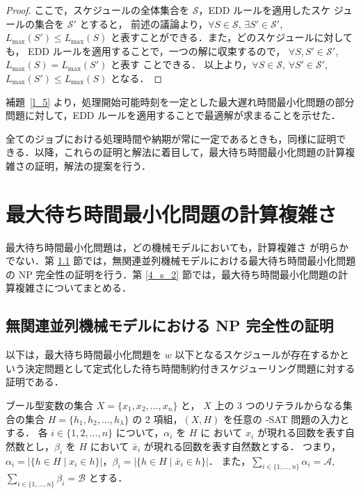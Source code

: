 \documentclass[12pt]{optlab-bachelor}
\begin{document}
\begin{proof}
  ここで，スケジュールの全体集合を $\mathcal{S}$，EDD ルールを適用したスケ
  ジュールの集合を $\mathcal{S}'$ とすると，
  前述の議論より，$\forall S \in \mathcal{S}$, $\exists S' \in \mathcal{S}'$, $L_{\max}(S') \le L_{\max}(S)$ と表すことができる．また，どのスケジュールに対しても，
  EDD ルールを適用することで，一つの解に収束するので，
  $\forall S, S' \in \mathcal{S}'$, $L_{\max}(S) = L_{\max}(S')$ と表す
  ことできる．
  以上より，$\forall S \in \mathcal{S}$, $\forall
  S' \in \mathcal{S}'$, $L_{\max}(S') \le L_{\max}(S)$ となる．
\end{proof}

補題~\ref{l_5} より，処理開始可能時刻を一定とした最大遅れ時間最小化問題の部分問題に対して，EDD ルールを適用することで最適解が求まることを示せた．

全てのジョブにおける処理時間や納期が常に一定であるときも，同様に証明で
きる．以降，これらの証明と解法に着目して，最大待ち時間最小化問題の計算複雑さの証明，解法の提案を行う．

\chapter{最大待ち時間最小化問題の計算複雑さ}\label{c_4}
最大待ち時間最小化問題は，どの機械モデルにおいても，計算複雑さ
が明らかでない．第 \ref{4_s_1} 節では，無関連並列機械モデルにおける最大待ち時間最小化問題の NP 完全性の証明を行う．第 \ref{4_s_2} 節では，最大待ち時間最小化問題の計算複雑さについてまとめる．

\section{無関連並列機械モデルにおける NP 完全性の証明}\label{4_s_1}
以下は，最大待ち時間最小化問題を $w$ 以下となるスケジュールが存在するかという決定問題として定式化した待ち時間制約付きスケジューリング問題に対する証明である．

ブール型変数の集合 $X =\{x_1, x_2,\ldots ,x_n\}$ と， $X$ 上の 3 つのリテラルからなる集合の集合 $H =\{h_1, h_2,\ldots ,h_{\lambda}\}$ の 2 項組，$(X,H)$ を任意の {-SAT} 問題の入力とする．
各 $i \in \{1,2,\ldots, n\}$ について，$\alpha_i$ を $H$ に おいて $x_i$ が現れる回数を表す自然数とし，$\beta_i$ を $H$ において $\bar x_i$ が現れる回数を表す自然数とする．
つまり，$\alpha_i = \big|\{h \in H \mid x_i \in h\}\big|$，$\beta_i = \big|\{h \in H \mid \bar x_i \in h\}\big|$．
また，$\displaystyle \sum_{i \in \{1,\ldots,n\}} \alpha_i = \mathcal{A}$, $\displaystyle \sum_{i \in \{1,\ldots,n\}} \beta_i = \mathcal{B}$  とする．
\end{document}
